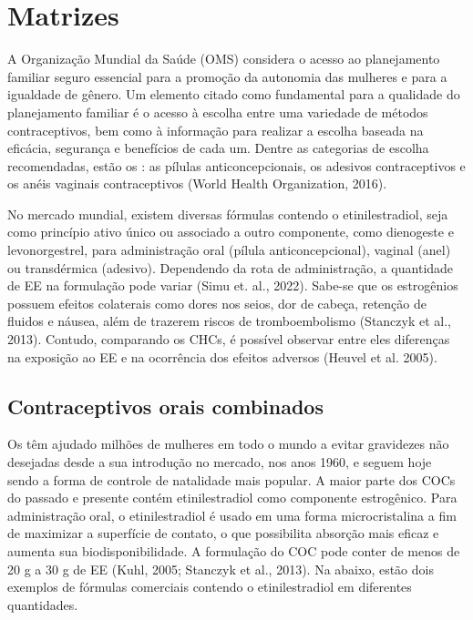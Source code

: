 \section{Matrizes}

A Organização Mundial da Saúde (OMS) considera o acesso ao planejamento familiar seguro essencial para a promoção da autonomia das mulheres e para a igualdade de gênero. Um elemento citado como fundamental para a qualidade do planejamento familiar é o acesso à escolha entre uma variedade de métodos contraceptivos, bem como à informação para realizar a escolha baseada na eficácia, segurança e benefícios de cada um. Dentre as categorias de escolha recomendadas, estão os : as pílulas anticoncepcionais, os adesivos contraceptivos e os anéis vaginais contraceptivos (World Health Organization, 2016).

No mercado mundial, existem diversas fórmulas contendo o etinilestradiol, seja como princípio ativo único ou associado a outro componente, como dienogeste e levonorgestrel, para administração oral (pílula anticoncepcional),  vaginal (anel) ou transdérmica (adesivo). Dependendo da rota de administração, a quantidade de EE na formulação pode variar (Simu et. al., 2022). Sabe-se que os estrogênios possuem efeitos colaterais como dores nos seios, dor de cabeça, retenção de fluidos e náusea, além de trazerem riscos de tromboembolismo (Stanczyk et al., 2013). Contudo, comparando os CHCs, é possível observar entre eles diferenças na exposição ao EE e na ocorrência dos efeitos adversos (Heuvel et al. 2005).

\subsection{Contraceptivos orais combinados}

Os  têm ajudado milhões de mulheres em todo o mundo a evitar gravidezes não desejadas desde a sua introdução no mercado, nos anos 1960, e seguem hoje sendo a forma de controle de natalidade mais popular. A maior parte dos COCs do passado e presente contém etinilestradiol como componente estrogênico. Para administração oral, o etinilestradiol é usado em uma forma microcristalina a fim de maximizar a superfície de contato, o que possibilita absorção mais eficaz e aumenta sua biodisponibilidade. A formulação do COC pode conter de menos de 20 \textmu g a 30 \textmu g de EE (Kuhl, 2005; Stanczyk et al., 2013). Na  abaixo, estão dois exemplos de fórmulas comerciais contendo o etinilestradiol em diferentes quantidades.

